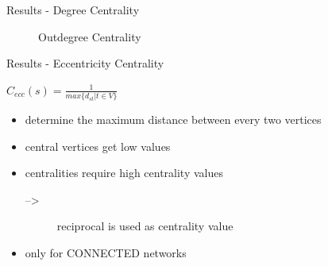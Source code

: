 \begin{frame}{Results - Degree Centrality}
\begin{figure}
\hfill
{}
\caption{Outdegree Centrality}
\end{figure}
\end{frame}
\begin{frame}{Results - Eccentricity Centrality}
	\begin{definition}
		$C_{ecc}(s) = \frac{1}{max\{d_{st}|t\in V\}}$
	\end{definition}
	\begin{itemize}
		\item determine the maximum distance between every two vertices
		\item central vertices get low values
		\item centralities require high centrality values
		\begin{description}
			\item[-->] reciprocal is used as centrality value
		\end{description}
		\item only for CONNECTED networks
	\end{itemize}
\end{frame}
